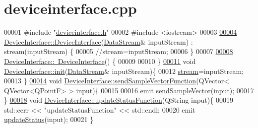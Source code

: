\hypertarget{deviceinterface_8cpp_source}{}\section{deviceinterface.\+cpp}
\label{deviceinterface_8cpp_source}

\begin{DoxyCode}
00001 \textcolor{preprocessor}{#include "\hyperlink{deviceinterface_8h}{deviceinterface.h}"}
00002 \textcolor{preprocessor}{#include <iostream>}
00003      
\hypertarget{deviceinterface_8cpp_source.tex_l00004}{}\hyperlink{classDeviceInterface_a9923935a7fa7b3134568ec7fd97705e3}{00004}     \hyperlink{classDeviceInterface_a9923935a7fa7b3134568ec7fd97705e3}{DeviceInterface::DeviceInterface}(\hyperlink{classDataStream}{DataStream}& inputStream) : 
      stream(inputStream) \{
00005         \textcolor{comment}{//stream=inputStream;}
00006     \}
00007     
\hypertarget{deviceinterface_8cpp_source.tex_l00008}{}\hyperlink{classDeviceInterface_a668a221c7a77701e25719f406d407746}{00008}     \hyperlink{classDeviceInterface_a668a221c7a77701e25719f406d407746}{DeviceInterface::~DeviceInterface}() \{
00009 
00010     \}
\hypertarget{deviceinterface_8cpp_source.tex_l00011}{}\hyperlink{classDeviceInterface_a03e9c1bfeabe1a97f05bf9107b89ae67}{00011}     \textcolor{keywordtype}{void} \hyperlink{classDeviceInterface_a03e9c1bfeabe1a97f05bf9107b89ae67}{DeviceInterface::init}(\hyperlink{classDataStream}{DataStream}& inputStream)\{
00012         \hyperlink{classDeviceInterface_ac98f5cd34bafb43265436b29b9f734fa}{stream}=inputStream;
00013     \}
\hypertarget{deviceinterface_8cpp_source.tex_l00014}{}\hyperlink{classDeviceInterface_adae4c7e07e9bdbbe62be961fd306b5c8}{00014}     \textcolor{keywordtype}{void} \hyperlink{classDeviceInterface_adae4c7e07e9bdbbe62be961fd306b5c8}{DeviceInterface::sendSampleVectorFunction}(QVector<
      QVector<QPointF> > input)\{
00015 
00016         emit \hyperlink{classDeviceInterface_ae1bcd766865161a659076d2561e79dc5}{sendSampleVector}(input);
00017     \}
\hypertarget{deviceinterface_8cpp_source.tex_l00018}{}\hyperlink{classDeviceInterface_a83df9dc924dbe0e6c3e0d0fef2a604d0}{00018}         \textcolor{keywordtype}{void} \hyperlink{classDeviceInterface_a83df9dc924dbe0e6c3e0d0fef2a604d0}{DeviceInterface::updateStatusFunction}(QString input)\{
00019             std::cerr << \textcolor{stringliteral}{"updateStatusFunction"} << std::endl;
00020             emit \hyperlink{classDeviceInterface_ac64a65f54f41f0b7ff4c846ac7fdbef7}{updateStatus}(input);
00021         \}
\end{DoxyCode}
